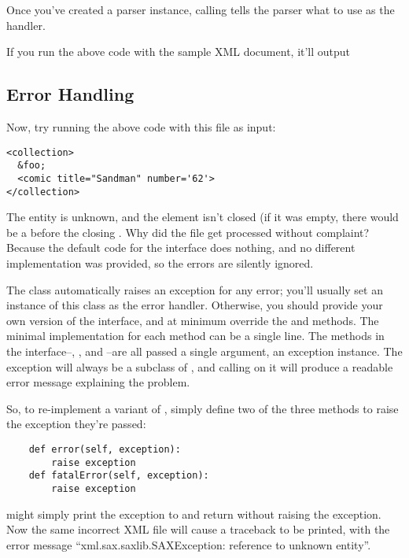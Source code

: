 \documentclass{howto}
\newcommand{\element}[1]{\code{#1}}
\begin{document}
Once you've created a parser instance, calling
 tells the parser what to use as the handler.

If you run the above code with the sample XML document, it'll output

\subsection{Error Handling}

Now, try running the above code with this file as input:
\begin{verbatim}
<collection>
  &foo;
  <comic title="Sandman" number='62'>
</collection>
\end{verbatim}

The  entity is unknown, and the \element{comic} element
isn't closed (if it was empty, there would be a \samp{/} before the
closing \samp{>}.  Why did the file get processed without complaint?
Because the default code for the  interface does
nothing, and no different implementation was provided, so the errors
are silently ignored.

The  class automatically raises an exception for
any error; you'll usually set an instance of this class as the error
handler.  Otherwise, you should provide your own version of the
 interface, and at minimum override the
 and  methods.  The minimal
implementation for each method can be a single line.  The methods in
the  interface--, ,
and --are all passed a single argument, an
exception instance.  The exception will always be a subclass of
, and calling  on it will produce
a readable error message explaining the problem.

So, to re-implement a variant of , simply define
two of the three methods to raise the exception they're passed:

\begin{verbatim}
    def error(self, exception):
        raise exception
    def fatalError(self, exception):
        raise exception
\end{verbatim}

 might simply print the exception to  
and return without raising the exception.  Now the same incorrect XML
file will cause a traceback to be printed, with the error message
``xml.sax.saxlib.SAXException: reference to unknown entity''.  
\end{document}
